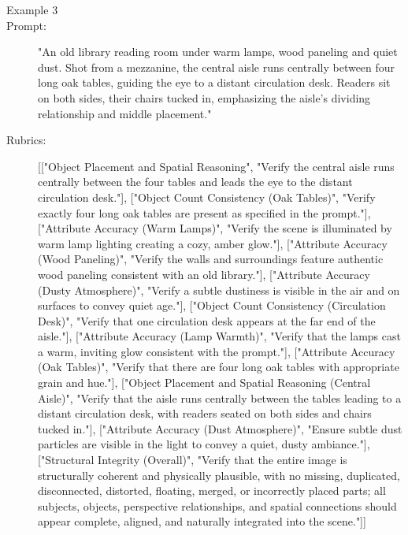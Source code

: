 \documentclass{llmxive}
\begin{document}
\begin{tcolorbox}
\begin{description}
\item[Example 3]
\item[Prompt:] "An old library reading room under warm lamps, wood paneling and quiet dust. Shot from a mezzanine, the central aisle runs centrally between four long oak tables, guiding the eye to a distant circulation desk. Readers sit on both sides, their chairs tucked in, emphasizing the aisle’s dividing relationship and middle placement."
\item[Rubrics:] [["Object Placement and Spatial Reasoning", "Verify the central aisle runs centrally between the four tables and leads the eye to the distant circulation desk."], ["Object Count Consistency (Oak Tables)", "Verify exactly four long oak tables are present as specified in the prompt."], ["Attribute Accuracy (Warm Lamps)", "Verify the scene is illuminated by warm lamp lighting creating a cozy, amber glow."], ["Attribute Accuracy (Wood Paneling)", "Verify the walls and surroundings feature authentic wood paneling consistent with an old library."], ["Attribute Accuracy (Dusty Atmosphere)", "Verify a subtle dustiness is visible in the air and on surfaces to convey quiet age."], ["Object Count Consistency (Circulation Desk)", "Verify that one circulation desk appears at the far end of the aisle."], ["Attribute Accuracy (Lamp Warmth)", "Verify that the lamps cast a warm, inviting glow consistent with the prompt."], ["Attribute Accuracy (Oak Tables)", "Verify that there are four long oak tables with appropriate grain and hue."], ["Object Placement and Spatial Reasoning (Central Aisle)", "Verify that the aisle runs centrally between the tables leading to a distant circulation desk, with readers seated on both sides and chairs tucked in."], ["Attribute Accuracy (Dust Atmosphere)", "Ensure subtle dust particles are visible in the light to convey a quiet, dusty ambiance."], ["Structural Integrity (Overall)", "Verify that the entire image is structurally coherent and physically plausible, with no missing, duplicated, disconnected, distorted, floating, merged, or incorrectly placed parts; all subjects, objects, perspective relationships, and spatial connections should appear complete, aligned, and naturally integrated into the scene."]]


\end{description}
\end{tcolorbox}
\end{document}
